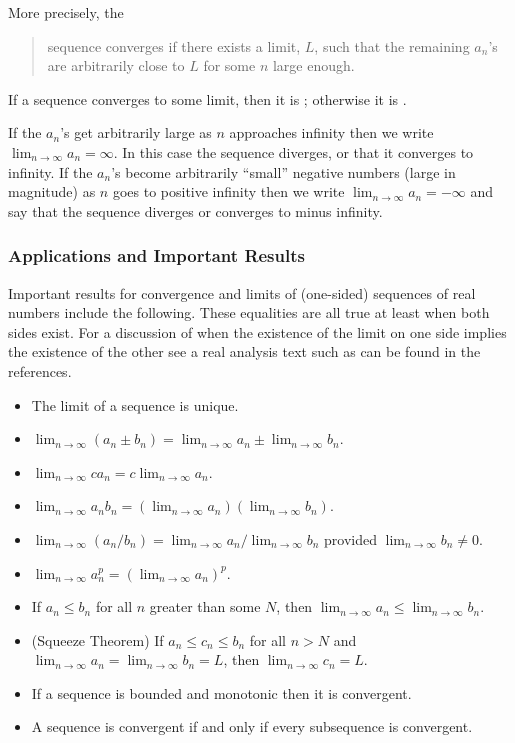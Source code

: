 More precisely, the 
\begin{quote}
sequence converges if there exists a limit, $L$, such that the remaining $a_n$'s are arbitrarily close to $L$ for some $n$ large enough.
\end{quote}

If a sequence converges to some limit, then it is ; otherwise it is .

If the $a_n$'s get arbitrarily large as $n$ approaches infinity then we write $\lim_{n\to\infty} a_n = \infty$. In this case the sequence  diverges, or that it converges to infinity. If the $a_n$'s become arbitrarily ``small'' negative numbers (large in magnitude) as $n$ goes to positive infinity then we write $\lim_{n\to\infty} a_n = -\infty$ and say that the sequence diverges or converges to minus infinity.


\subsubsection{Applications and Important Results}
Important results for convergence and limits of (one-sided) sequences of real numbers include the following. These equalities are all true at least when both sides exist. For a discussion of when the existence of the limit on one side implies the existence of the other see a real analysis text such as can be found in the references.

\begin{itemize}
\item The limit of a sequence is unique.
%
\item $\lim_{n\to\infty}(a_n \pm b_n) = \lim_{n\to\infty} a_n \pm \lim_{n\to\infty} b_n$.
%
\item $\lim_{n\to\infty} c a_n = c\lim_{n\to\infty} a_n$.
%
\item $\lim_{n\to\infty} a_n b_n = \left(\lim_{n\to\infty} a_n\right) \left(\lim_{n\to\infty} b_n\right) $.
%
\item $\lim_{n\to\infty}\left(a_n / b_n \right) = \lim_{n\to\infty} a_n / \lim_{n\to\infty} b_n$ provided $\lim_{n\to\infty} b_n \neq 0$.
%
\item $\lim_{n\to\infty} a_n^p = \left(\lim_{n\to\infty} a_n\right)^p$.
%
\item If $a_n\leq b_n$ for all $n$ greater than some $N$, then $\lim_{n\to\infty} a_n \leq \lim_{n\to\infty} b_n$.
%
\item (Squeeze Theorem) If $a_n\leq c_n\leq b_n$ for all $n > N$ and $\lim_{n\to\infty} a_n = \lim_{n\to\infty} b_n= L$,   then $\lim_{n\to\infty} c_n = L$.
%
\item If a sequence is bounded and monotonic then it is convergent.
%
\item A sequence is convergent if and only if every subsequence is convergent.
\end{itemize}


